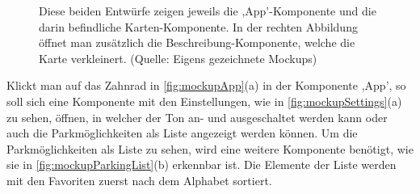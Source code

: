 \begin{figure}[h!]
	\centering
	\qquad
	\caption[Diese beiden Entwürfe zeigen jeweils die ,App'-Komponente und die darin befindliche Karten-Komponente. In der rechten Abbildung öffnet man zusätzlich die Beschreibung-Komponente, welche die Karte verkleinert.]{Diese beiden Entwürfe zeigen jeweils die ,App'-Komponente und die darin befindliche Karten-Komponente. In der rechten Abbildung öffnet man zusätzlich die Beschreibung-Komponente, welche die Karte verkleinert. (Quelle: Eigens gezeichnete Mockups)}
	\label{fig:mockupApp}
	\label{fig:mockupBeschreibung}
\end{figure}

Klickt man auf das Zahnrad in \autoref{fig:mockupApp}(a) in der Komponente ,App', so soll sich eine Komponente mit den Einstellungen, wie in \autoref{fig:mockupSettings}(a) zu sehen, öffnen, in welcher der Ton an- und ausgeschaltet werden kann oder auch die Parkmöglichkeiten als Liste angezeigt werden können. Um die Parkmöglichkeiten als Liste zu sehen, wird eine weitere Komponente benötigt, wie sie in \autoref{fig:mockupParkingList}(b) erkennbar ist. Die Elemente der Liste werden mit den Favoriten zuerst nach dem Alphabet sortiert. 

